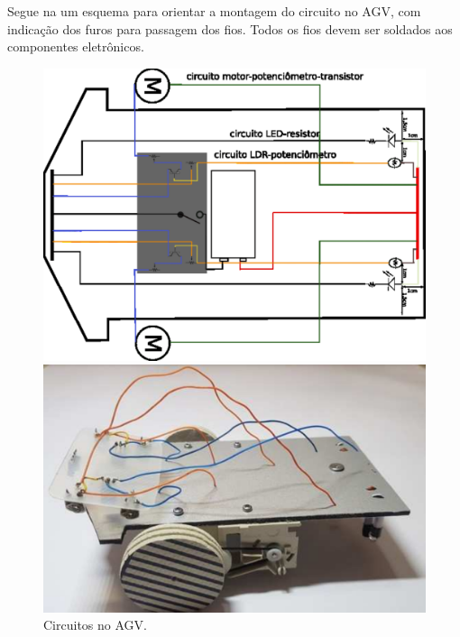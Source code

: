 \documentclass{textolivre}
\begin{document}
Segue na  um esquema para orientar a montagem do circuito no AGV, com
indicação dos furos para passagem dos fios. Todos os fios devem ser soldados
aos componentes eletrônicos.

\begin{figure}[H]
\begin{minipage}{0.47\textwidth}
\includegraphics[width=\linewidth]{figure-22.pdf}
\subcaption{}
\end{minipage}
\hfill
\begin{minipage}{0.47\textwidth} 
\includegraphics[width=\linewidth]{figure-23.pdf}
\subcaption{}
\end{minipage}
\caption{Circuitos no AGV.}
\label{fig16}
\end{figure}
\end{document}
